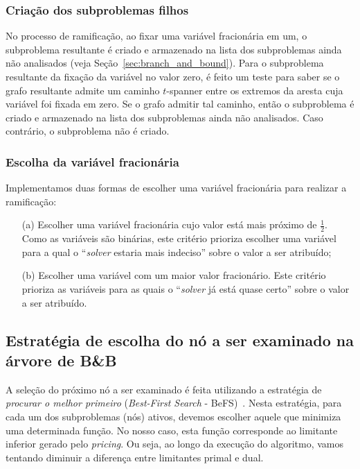 \subsubsection{Criação dos subproblemas filhos}
\label{sec:nos_filhos}
No processo de ramificação, ao fixar uma variável fracionária em um,
o subproblema resultante é criado e armazenado na lista dos
subproblemas ainda não analisados (veja
Seção~\ref{sec:branch_and_bound}). Para o subproblema resultante da
fixação da variável no valor zero, é feito um teste para saber se o
grafo resultante admite um caminho $t$-spanner entre os extremos da
aresta cuja variável foi fixada em zero. Se o grafo admitir tal
caminho, então o subproblema é criado e armazenado na lista dos
subproblemas ainda não analisados. Caso contrário, o subproblema não é
criado.

\subsubsection{Escolha da variável fracionária}
Implementamos duas formas de escolher uma variável fracionária para
realizar a ramificação:

\begin{itemize}
\item[{\rm (a)}] Escolher uma variável fracionária cujo valor está
  mais próximo de $\frac{1}{2}$.  Como as variáveis são binárias, este
  critério prioriza escolher uma variável para a qual o ``\emph{solver}
  estaria mais indeciso'' sobre o valor a ser atribuído;

\item[{\rm (b)}] Escolher uma variável com um maior valor
  fracionário. Este critério prioriza as variáveis para as quais o
  ``\emph{solver} já está quase certo'' sobre o valor a ser atribuído.

  \end{itemize}

\subsection{Estratégia de escolha do nó a ser examinado na árvore de B\&B}
\label{sec:befs}

A seleção do próximo nó a ser examinado é feita utilizando a
estratégia de \emph{procurar o melhor primeiro} (\emph{Best-First
  Search} - BeFS)~\cite{MorrisonJSS2016,Clausen1999}. Nesta
estratégia, para cada um dos subproblemas (nós) ativos, devemos
escolher aquele que minimiza uma determinada função. No nosso caso,
esta função corresponde ao limitante inferior gerado pelo
\emph{pricing}. Ou seja, ao longo da execução do algoritmo, vamos
tentando diminuir a diferença entre limitantes primal e dual.

